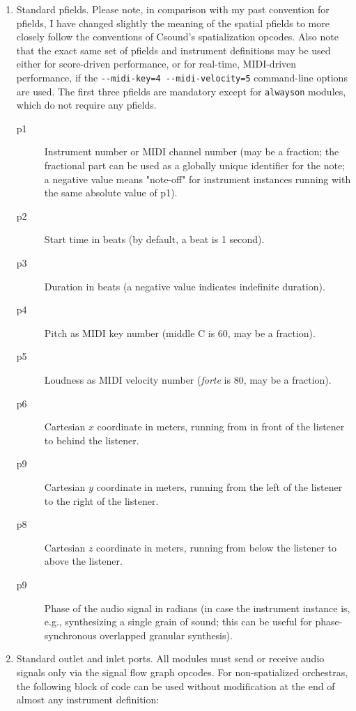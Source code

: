 \documentclass[12pt,letterpaper,onecolumn]{scrartcl}
\begin{document}
\begin{enumerate}
	\item Standard pfields. Please note, in comparison with my past convention for pfields, I have changed slightly the meaning of the spatial pfields to more closely follow the conventions of Csound's spatialization opcodes. Also note that the exact same set of pfields and instrument definitions may be used either for score-driven performance, or for real-time, MIDI-driven performance, if the \texttt{-\--midi-key=4 -\--midi-velocity=5} command-line options are used. The first three pfields are mandatory except for \texttt{alwayson} modules, which do not require any pfields.
        \begin{description}
			\item[p1]	Instrument number or MIDI channel number (may be a fraction; the fractional part can be used as a globally unique identifier for the note; a negative value means "note-off" for instrument instances running with the same absolute value of p1).
			\item[p2] 	Start time in beats (by default, a beat is 1 second).
			\item[p3] 	Duration in beats (a negative value indicates indefinite duration).
			\item[p4] 	Pitch as MIDI key number (middle C is 60, may be a fraction).
			\item[p5] 	Loudness as MIDI velocity number (\emph{forte} is 80, may be a fraction).
			\item[p6] 	Cartesian $x$ coordinate in meters, running from in front of the listener to behind the listener.
			\item[p9] 	Cartesian $y$ coordinate in meters, running from the left of the listener to the right of the listener.
			\item[p8] 	Cartesian $z$ coordinate in meters, running from below the listener to above the listener.
			\item[p9] 	Phase of the audio signal in radians (in case the instrument instance is, e.g., synthesizing a single grain of sound; this can be useful for phase-synchronous overlapped granular synthesis).
        \end{description}
	\item Standard outlet and inlet ports. All modules must send or receive audio signals only via the signal flow graph opcodes. For non-spatialized orchestras, the following block of code can be used without modification at the end of almost any instrument definition:
    

\end{enumerate}
\end{document}
